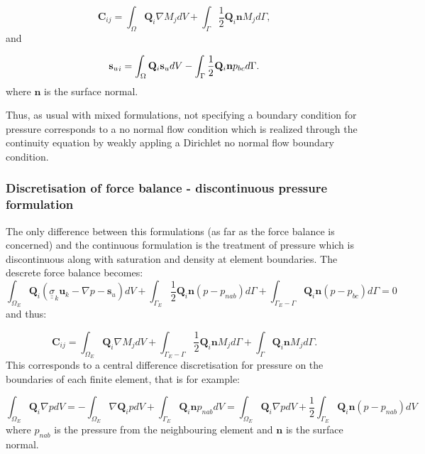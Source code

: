 \begin{equation}
{\mathbf C}_{ij}=\int_\Omega {\mathbf Q}_i \nabla M_j dV
+ \int_\Gamma \frac{1}{2}{\mathbf Q}_i {\mathbf n}  M_j d\Gamma,
\end{equation}
and

\begin{equation}
{{\bf s}_u}_i= \int_\Omega {\mathbf Q}_i {\mathbf s}_u dV
- \int_\Gamma \frac{1}{2}{\mathbf Q}_i {\mathbf n} p_{bc} d\Gamma.
\end{equation}
where ${\mathbf n}$ is the surface normal.

Thus, as usual with mixed formulations, not specifying a
boundary condition for pressure corresponds to a no
normal flow condition which is realized through the continuity
equation by weakly appling a Dirichlet no normal
flow boundary condition.



\subsubsection{Discretisation of force balance - discontinuous pressure formulation}

The only difference between this formulations (as far as the force balance
is concerned) and the continuous formulation is the treatment of pressure
which is discontinuous along with saturation and density at element
boundaries. The descrete force balance becomes:
\begin{equation}
\int_{\Omega_E} {\mathbf Q}_i ( {\underline {\underline \sigma}}_k
{\mathbf u}_k - \nabla p -{\mathbf s}_u) dV
+  \int_{\Gamma_{E}} \frac{1}{2}{\mathbf Q}_i {\mathbf n} (p - p_{nab}) d\Gamma
+  \int_{\Gamma_{E}-\Gamma} {\mathbf Q}_i {\mathbf n} (p - p_{bc}) d\Gamma =0
\end{equation}
and thus:

\begin{equation}
{\mathbf C}_{ij}=\int_{\Omega_E} {\mathbf Q}_i \nabla M_j dV
+ \int_{\Gamma_{E}-\Gamma} \frac{1}{2}{\mathbf Q}_i {\mathbf n} M_j d\Gamma
+ \int_\Gamma {\mathbf Q}_i {\mathbf n} M_j d\Gamma .
\end{equation}
This corresponds to a central difference discretisation for pressure
on the boundaries of each finite element, that is for example:

\begin{equation}
\int_{\Omega_E} {\mathbf Q}_i \nabla p dV = -\int_{\Omega_E} \nabla {\mathbf Q}_i  p dV
+ \int_{\Gamma_E} {\mathbf Q}_i {\mathbf n} p_{nab} dV
= \int_{\Omega_E} {\mathbf Q}_i \nabla p dV
+ \frac{1}{2} \int_{\Gamma_E} {\mathbf Q}_i {\mathbf n} (p-p_{nab}) dV
\label{pipe-dg-sat-form}
\end{equation}
where $p_{nab}$ is the pressure from the neighbouring
element and ${\mathbf n}$ is the surface normal.


